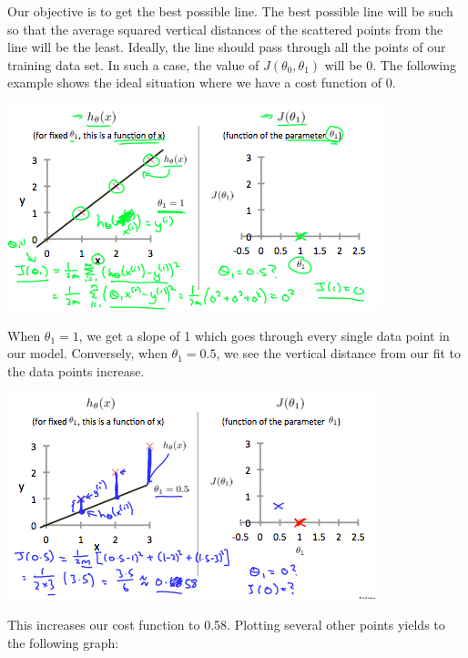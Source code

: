 \documentclass[UTF8]{article}
\begin{document}
Our objective is to get the best possible line. The best possible line will be such so that the average squared vertical distances of the scattered points from the line will be the least. Ideally, the line should pass through all the points of our training data set. In such a case, the value of $J(\theta_0,\theta_1)$ will be 0. The following example shows the ideal situation where we have a cost function of 0.

\includegraphics[width = \textwidth]{NotePics/2_2_1_1.png}

When $\theta_1=1$, we get a slope of 1 which goes through every single data point in our model. Conversely, when $\theta_1=0.5$, we see the vertical distance from our fit to the data points increase.

\includegraphics[width = \textwidth]{NotePics/2_2_1_2.png}

This increases our cost function to 0.58. Plotting several other points yields to the following graph:
\end{document}
